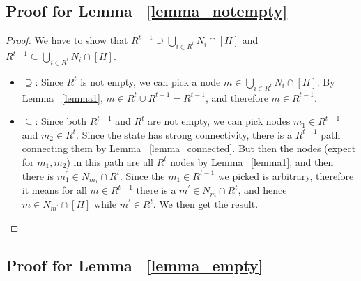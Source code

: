 \documentclass[12pt]{article}
\theoremstyle{remark}
\theoremstyle{remark}
\begin{document}
\subsection{Proof for Lemma ~\ref{lemma_notempty}}
\begin{proof}
We have to show that $R^{t-1}\supseteq \bigcup_{i\in R^t} N_i\cap [H]$ and $R^{t-1}\subseteq \bigcup_{i\in R^t} N_i\cap [H]$. 
\begin{itemize}
\item $\supseteq $: Since $R^t$ is not empty, we can pick a node $m\in \bigcup_{i\in R^t} N_i\cap [H]$. By Lemma ~\ref{lemma1}, $m\in R^t\cup R^{t-1}=R^{t-1}$, and therefore $m\in R^{t-1}$.
\item $\subseteq$: Since both $R^{t-1}$ and $R^{t}$ are not empty, we can pick nodes $m_1\in R^{t-1}$ and $m_2\in R^{t}$. Since the state has strong connectivity, there is a $R^{t-1}$ path connecting them by Lemma ~\ref{lemma_connected}. But then the nodes (expect for $m_1,m_2$) in this path are all $R^{t}$ nodes by Lemma ~\ref{lemma1}, and then there is $m^{'}_1\in N_{m_1}\cap R^t$. Since the $m_1\in R^{t-1}$ we picked is arbitrary, therefore it means for all $m\in R^{t-1}$ there is a $m^{'}\in N_{m}\cap R^{t}$, and hence $m\in N_{m^{'}}\cap [H]$ while $m^{'}\in R^t$. We then get the result. 
\end{itemize}

\end{proof}

\subsection{Proof for Lemma ~\ref{lemma_empty}}
\end{document}
